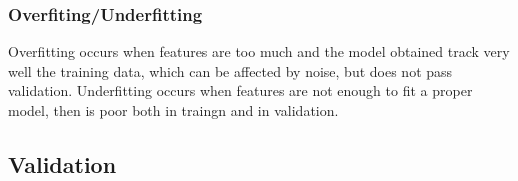 \subsubsection{Overfiting/Underfitting}
Overfitting occurs when features are too much and the model obtained track very well the training data, which can be affected by noise, but does not pass validation.
Underfitting occurs when features are not enough to fit a proper model, then is poor both in traingn and in validation.





\subsection{Validation}


